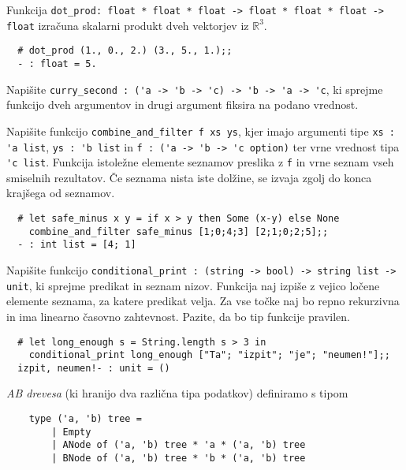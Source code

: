 \documentclass[arhiv]{../izpit}
\begin{document}
	
	

	\naloga 
  
	\podnaloga Funkcija \verb|dot_prod: float * float * float -> float * float * float -> float| izračuna skalarni produkt dveh vektorjev iz $\mathbb{R}^3$.
  \begin{verbatim}
  # dot_prod (1., 0., 2.) (3., 5., 1.);;
  - : float = 5.
  \end{verbatim}

  \podnaloga Napišite \verb|curry_second : ('a -> 'b -> 'c) -> 'b -> 'a -> 'c|, ki sprejme funkcijo dveh argumentov in drugi argument fiksira na podano vrednost. 
  
	\podnaloga Napišite funkcijo \verb|combine_and_filter f xs ys|, kjer imajo argumenti tipe \verb|xs : 'a list|, \verb|ys : 'b list| in \verb|f : ('a -> 'b -> 'c option)| ter vrne vrednost tipa \verb|'c list|. Funkcija istoležne elemente seznamov preslika z \verb|f| in vrne seznam vseh smiselnih rezultatov. Če seznama nista iste dolžine, se izvaja zgolj do konca krajšega od seznamov.
	\begin{verbatim}
  # let safe_minus x y = if x > y then Some (x-y) else None
    combine_and_filter safe_minus [1;0;4;3] [2;1;0;2;5];;
  - : int list = [4; 1]
	\end{verbatim}
	
	\podnaloga Napišite funkcijo \verb|conditional_print : (string -> bool) -> string list -> unit|, ki sprejme predikat in seznam nizov. Funkcija naj izpiše z vejico ločene elemente seznama, za katere predikat velja. Za vse točke naj bo repno rekurzivna in ima linearno časovno zahtevnost. Pazite, da bo tip funkcije pravilen.
	\begin{verbatim}
  # let long_enough s = String.length s > 3 in
    conditional_print long_enough ["Ta"; "izpit"; "je"; "neumen!"];;
  izpit, neumen!- : unit = ()
	\end{verbatim}
  
  \naloga
  
  \textit{AB drevesa} (ki hranijo dva različna tipa podatkov) definiramo s tipom
  	\begin{verbatim}
  	type ('a, 'b) tree = 
  		| Empty
  		| ANode of ('a, 'b) tree * 'a * ('a, 'b) tree
  		| BNode of ('a, 'b) tree * 'b * ('a, 'b) tree
  	\end{verbatim}
  
\end{document}
